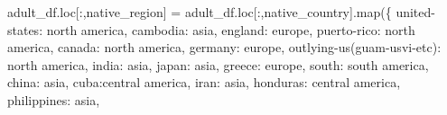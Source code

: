 \documentclass[
  letterpaper,
  DIV=11,
  numbers=noendperiod]{scrartcl}
\newenvironment{Shaded}{\begin{snugshade}}{\end{snugshade}}
\newcommand{\BuiltInTok}[1]{\textcolor[rgb]{0.00,0.23,0.31}{#1}}
\newcommand{\NormalTok}[1]{\textcolor[rgb]{0.00,0.23,0.31}{#1}}
\newcommand{\OperatorTok}[1]{\textcolor[rgb]{0.37,0.37,0.37}{#1}}
\newcommand{\StringTok}[1]{\textcolor[rgb]{0.13,0.47,0.30}{#1}}
\begin{document}
\begin{Shaded}
\begin{Highlighting}[]
\NormalTok{adult\_df.loc[:,}\StringTok{\textquotesingle{}native\_region\textquotesingle{}}\NormalTok{] }\OperatorTok{=}\NormalTok{ adult\_df.loc[:,}\StringTok{\textquotesingle{}native\_country\textquotesingle{}}\NormalTok{].}\BuiltInTok{map}\NormalTok{(\{}
    \StringTok{\textquotesingle{}united{-}states\textquotesingle{}}\NormalTok{: }\StringTok{\textquotesingle{}north america\textquotesingle{}}\NormalTok{,}
    \StringTok{\textquotesingle{}cambodia\textquotesingle{}}\NormalTok{: }\StringTok{\textquotesingle{}asia\textquotesingle{}}\NormalTok{,}
    \StringTok{\textquotesingle{}england\textquotesingle{}}\NormalTok{: }\StringTok{\textquotesingle{}europe\textquotesingle{}}\NormalTok{,}
    \StringTok{\textquotesingle{}puerto{-}rico\textquotesingle{}}\NormalTok{: }\StringTok{\textquotesingle{}north america\textquotesingle{}}\NormalTok{,}
    \StringTok{\textquotesingle{}canada\textquotesingle{}}\NormalTok{: }\StringTok{\textquotesingle{}north america\textquotesingle{}}\NormalTok{,}
     \StringTok{\textquotesingle{}germany\textquotesingle{}}\NormalTok{: }\StringTok{\textquotesingle{}europe\textquotesingle{}}\NormalTok{,}
     \StringTok{\textquotesingle{}outlying{-}us(guam{-}usvi{-}etc)\textquotesingle{}}\NormalTok{: }\StringTok{\textquotesingle{}north america\textquotesingle{}}\NormalTok{,}
    \StringTok{\textquotesingle{}india\textquotesingle{}}\NormalTok{: }\StringTok{\textquotesingle{}asia\textquotesingle{}}\NormalTok{,}
    \StringTok{\textquotesingle{}japan\textquotesingle{}}\NormalTok{: }\StringTok{\textquotesingle{}asia\textquotesingle{}}\NormalTok{,}
    \StringTok{\textquotesingle{}greece\textquotesingle{}}\NormalTok{: }\StringTok{\textquotesingle{}europe\textquotesingle{}}\NormalTok{,}
    \StringTok{\textquotesingle{}south\textquotesingle{}}\NormalTok{: }\StringTok{\textquotesingle{}south america\textquotesingle{}}\NormalTok{,}
    \StringTok{\textquotesingle{}china\textquotesingle{}}\NormalTok{: }\StringTok{\textquotesingle{}asia\textquotesingle{}}\NormalTok{,}
    \StringTok{\textquotesingle{}cuba\textquotesingle{}}\NormalTok{:}\StringTok{\textquotesingle{}central america\textquotesingle{}}\NormalTok{,}
    \StringTok{\textquotesingle{}iran\textquotesingle{}}\NormalTok{: }\StringTok{\textquotesingle{}asia\textquotesingle{}}\NormalTok{,}
    \StringTok{\textquotesingle{}honduras\textquotesingle{}}\NormalTok{: }\StringTok{\textquotesingle{}central america\textquotesingle{}}\NormalTok{,}
    \StringTok{\textquotesingle{}philippines\textquotesingle{}}\NormalTok{: }\StringTok{\textquotesingle{}asia\textquotesingle{}}\NormalTok{,}

\end{Highlighting}
\end{Shaded}
\end{document}
